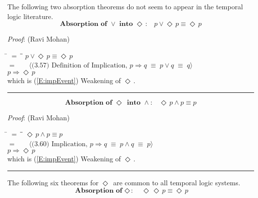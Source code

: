 \documentclass[12pt, fleqn, leqno]{article}
\newcommand{\lgap}{2pt}                             %
\newcommand{\mymathindent}{24pt}                    %
\newcommand{\equivs}{\ensuremath{\;\equiv\;}}       %
\newcommand{\impl}{\ensuremath{\Rightarrow}}        %
\newcommand{\Event}{\Diamond\,}
\newcommand{\myqed}{\rule[-.23ex]{1.2ex}{2.0ex}}
\newcommand{\myqedtab}{\hspace{384pt}}              %
\newcommand{\Gll} {\langle}                         %
\newcommand{\Ggg} {\rangle}                         %
\newcommand{\Hint}[1]     {\ \ \ $\Gll              \mbox{#1} \Ggg$ }   %
\begin{document}
The following two absorption theorems do not seem to appear in the temporal logic literature.
\begin{equation}\label{E:absOrIntoEvent}
\textbf{Absorption of $\lor$ into $\Event$:}\quad p \lor \Event p \equiv \Event p
\end{equation}

\emph{Proof}: (Ravi Mohan)
\begin{tabbing}
\hspace{\mymathindent} \= $= \;$ \= \myqedtab \= \kill
  \> \>   $p \lor \Event p \equiv \Event p$\\[\lgap]
  \> $=$  \>  \Hint{(3.57) Definition of Implication, $p\impl q \equivs p\lor q \equivs q$}\\[\lgap]
  \> \>   $p\impl \Event p$\\[\lgap]
  \> which is (\ref{E:impEvent}) Weakening of $\Event$. \quad \myqed
\end{tabbing}
\begin{equation}\label{E:absEventIntoAnd}
\textbf{Absorption of $\Event$ into $\land$:}\quad \Event p \land p \equiv p
\end{equation}

\emph{Proof}: (Ravi Mohan)
\begin{tabbing}
\hspace{\mymathindent} \= $= \;$ \= \myqedtab \= \kill
  \> \>   $\Event p \land p \equiv p$\\[\lgap]
  \> $=$  \>  \Hint{(3.60) Implication, $p\impl q \equivs p\land q \equivs p$}\\[\lgap]
  \> \>   $p\impl \Event p$\\[\lgap]
  \> which is (\ref{E:impEvent}) Weakening of $\Event$. \quad \myqed
\end{tabbing}

The following six theorems for $\Event$ are common to all temporal logic systems.
\begin{equation}\label{E:IdemEvent}
\textbf{Absorption of $\Event$:}\quad \Event\Event p \equiv \Event p
\end{equation}
\end{document}
